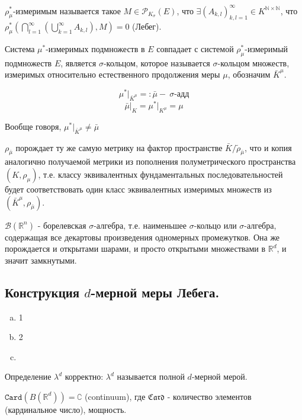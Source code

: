 \documentclass[a4paper, 12pt]{article}
\begin{document}
\begin{definition}
    $\rho_{\mu}^*$-измеримым называется такое $M \in \mathcal{P}_{K_{\sigma}}(E)$, что $\exists (A_{k,l})_{k,l = 1}^{\infty} \in K^{\mathbb{N} \times \mathbb{N}}$, что $\rho_{\mu}^*\left(\bigcap \limits_{l=1}^{\infty}\left(\bigcup \limits_{k = 1}^{\infty} A_{k,l} \right), M\right) = 0$ (Лебег).
\end{definition}

\begin{problem*}
    Система $\mu^*$-измеримых подмножеств в $E$ совпадает с системой $\rho^*_{\mu}$-измеримый подмножеств $E$, является $\sigma$-кольцом, которое называется $\sigma$-кольцом множеств, измеримых относительно естественного продолжения меры $\mu$, обозначим $\bar{K}^{\mu}$.

    $$ \mu^* \big|_{\bar{K}^{\mu}} =: \bar{\mu} - ~\text{$\sigma$-адд}$$
    $$ \bar{\mu} \big|_{K} = \mu^* \big|_{K^{\mu}} = \mu$$
\end{problem*}

\begin{remark}
    Вообще говоря, $\mu^* \big|_{\bar{K}^{\mu}} \neq \bar{\mu}$
\end{remark}

\begin{remark}
   $\rho_{\bar{\mu}}$ порождает ту же самую метрику на фактор пространстве $\bar{K}/\tilde{\rho}_{\bar{\mu}}$, что и копия аналогично получаемой метрики из пополнения полуметрического пространства $(K, \rho_{\mu})$, т.е. классу эквивалентных фундаментальных последовательностей будет соответствовать один класс эквивалентных измеримых множеств из $(\bar{K}^{\mu}, \rho_{\bar{\mu}})$.
\end{remark}

\begin{designation}
    $\mathscr{B}(\mathbb{R}^n)$ - борелевская $\sigma$-алгебра, т.е. наименьшее $\sigma$-кольцо или $\sigma$-алгебра, содержащая все декартовы произведения одномерных промежутков. Она же порождается и открытами шарами, и просто открытыми множествами в $\mathbb{R}^d$, и значит замкнутыми.
\end{designation}


\subsection*{Конструкция $d$-мерной меры Лебега.}

\begin{enumerate}[a)]
    \item  1
    \item  2
    \item 
\end{enumerate}

\begin{theorem}
    Определение $\lambda ^ d$ корректно: $\lambda ^ d$ называется полной $d$-мерной мерой.
\end{theorem}

\begin{remark}
$\mathtt{Card}(B(\mathbb{R}^d)) = \complement$ (continuum), где $\mathfrak{Card}$ - количество элементов (кардинальное число), мощность.
\end{remark}
\end{document}
